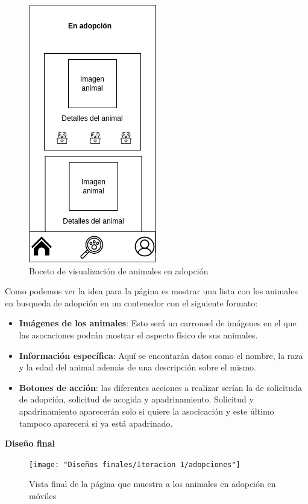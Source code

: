 \begin{figure}[H]
	\centering
	\includegraphics[width=0.31\linewidth]{"bocetos/iteracion 1/adopciones.drawio"}
	\caption{Boceto de visualización de animales en adopción}
	\label{fig:adopciones}
\end{figure}

Como podemos ver la idea para la página es mostrar una lista con los animales en busqueda de adopción en un contenedor con el siguiente formato:

\begin{itemize}
	\item \textbf{Imágenes de los animales}: Esto será un carrousel de imágenes en el que las asocaciones podrán mostrar el aspecto físico de sus animales.
	\item \textbf{Información específica}: Aquí se encontarán datos como el nombre, la raza y la edad del animal además de una descripción sobre el mismo.
	\item \textbf{Botones de acción}: las diferentes acciones a realizar serían la de solicituda de adopción, solicitud de acogida y apadrinamiento. Solicitud y apadrinamiento aparecerán solo si quiere la asocicación y este último tampoco aparecerá si ya está apadrinado.
\end{itemize}

\textbf{Diseño final} %

\begin{figure}[H]
		\centering
		\texttt{[image: "Diseños finales/Iteracion 1/adopciones"]}
		\caption{Vista final de la página que muestra a los animales en adopción en móviles}
		\label{fig:adopcionesDef}
\end{figure}


